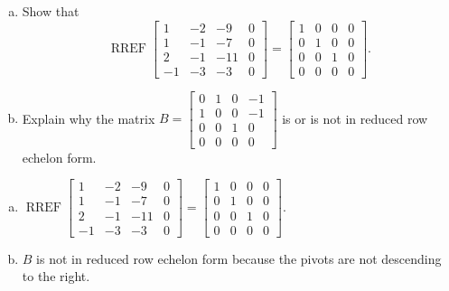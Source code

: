 
\begin{exerciseStatement}

\begin{enumerate}[(a)]
\item Show that \[\operatorname{RREF} \left[\begin{array}{cccc}
1 & -2 & -9 & 0 \\
1 & -1 & -7 & 0 \\
2 & -1 & -11 & 0 \\
-1 & -3 & -3 & 0
\end{array}\right] = \left[\begin{array}{cccc}
1 & 0 & 0 & 0 \\
0 & 1 & 0 & 0 \\
0 & 0 & 1 & 0 \\
0 & 0 & 0 & 0
\end{array}\right] .\]
\item Explain why the matrix \(B= \left[\begin{array}{cccc}
0 & 1 & 0 & -1 \\
1 & 0 & 0 & -1 \\
0 & 0 & 1 & 0 \\
0 & 0 & 0 & 0
\end{array}\right] \) is or is not in reduced row echelon form.
\end{enumerate}
    
\end{exerciseStatement}
    
\begin{exerciseAnswer} 

\begin{enumerate}[(a)]
\item \(\operatorname{RREF} \left[\begin{array}{cccc}
1 & -2 & -9 & 0 \\
1 & -1 & -7 & 0 \\
2 & -1 & -11 & 0 \\
-1 & -3 & -3 & 0
\end{array}\right] = \left[\begin{array}{cccc}
1 & 0 & 0 & 0 \\
0 & 1 & 0 & 0 \\
0 & 0 & 1 & 0 \\
0 & 0 & 0 & 0
\end{array}\right] .\)
\item \(B\) is not in reduced row echelon form because the pivots are not descending to the right. 
\end{enumerate}
    
\end{exerciseAnswer}
    
